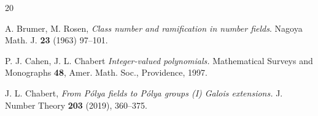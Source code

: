 \documentclass{jams-l}
\theoremstyle{definition}
\theoremstyle{remark}
\numberwithin{equation}{section}
\begin{document}
\begin{thebibliography}{20}


 

 A. Brumer, M. Rosen, \textit{Class number and ramification in number fields}. Nagoya Math. J. \textbf{23} (1963) 97--101.

 P. J. Cahen, J. L. Chabert \textit{Integer-valued polynomials.} Mathematical Surveys and Monographs \textbf{48}, Amer. Math. Soc., Providence, 1997.

 J. L. Chabert, \textit{From P\'olya fields to P\'olya groups (I) Galois extensions.} J. Number Theory \textbf{203} (2019), 360--375.



 
 





\end{thebibliography}
\end{document}
